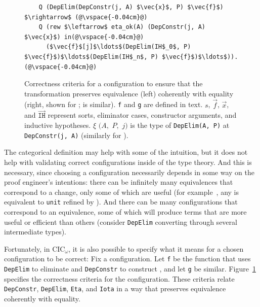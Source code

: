 \begin{figure}
\begin{minipage}{0.56\textwidth}
\begin{lstlisting}
    Q (DepElim(DepConstr(j, A) $\vec{x}$, P) $\vec{f}$) $\rightarrow$ (@\vspace{-0.04cm}@)
    Q (rew $\leftarrow$ eta_ok(A) (DepConstr(j, A) $\vec{x}$) in(@\vspace{-0.04cm}@)
      ($\vec{f}$[j]$\ldots$(DepElim(IH$_0$, P) $\vec{f}$)$\ldots$(DepElim(IH$_n$, P) $\vec{f}$)$\ldots$)).(@\vspace{-0.04cm}@)
\end{lstlisting}
\end{minipage}
\vspace{-0.2cm}
\caption{Correctness criteria for a configuration to ensure that the transformation
preserves equivalence (left) coherently with equality (right, shown for \Aa; \B is similar). \lstinline{f} and \lstinline{g} are defined in text. $s$, $\vec{f}$, $\vec{x}$, and $\vec{\mathtt{IH}}$ represent
sorts, eliminator cases, constructor arguments, and inductive hypotheses. $\xi$ $(A,$ $P,$ $j)$ is the type 
of \lstinline{DepElim(A, P)} at \lstinline{DepConstr(j, A)} (similarly for \B).} %
\label{fig:spec}
\end{figure}

The categorical definition may help with some of the intuition, but it does not help with validating correct configurations inside of the type theory.
And this is necessary, since choosing a configuration necessarily depends in some way on the proof engineer's intentions:
there can be infinitely many equivalences that correspond to a 
change, only some of which are useful (for example~\href{https://github.com/uwplse/pumpkin-pi/blob/v2.0.0/plugin/coq/playground/refine_unit.v}{}, any \Aa is equivalent to \lstinline{unit} refined by \Aa). %
And there can be many configurations that correspond
to an equivalence, some of which will produce terms that are more useful or efficient than others
(consider \lstinline{DepElim} converting through several intermediate types).

Fortunately, in CIC$_{\omega}$, it is also possible to specify 
what it means for a chosen configuration to be correct:
Fix a configuration. Let \lstinline{f} be the function that uses \lstinline{DepElim} to eliminate \Aa and \lstinline{DepConstr} to construct \B,
and let \lstinline{g} be similar.
Figure~\ref{fig:spec} specifies the correctness criteria for the configuration.
These criteria relate \lstinline{DepConstr}, \lstinline{DepElim}, \lstinline{Eta}, and \lstinline{Iota}
in a way that preserves equivalence coherently with equality.


